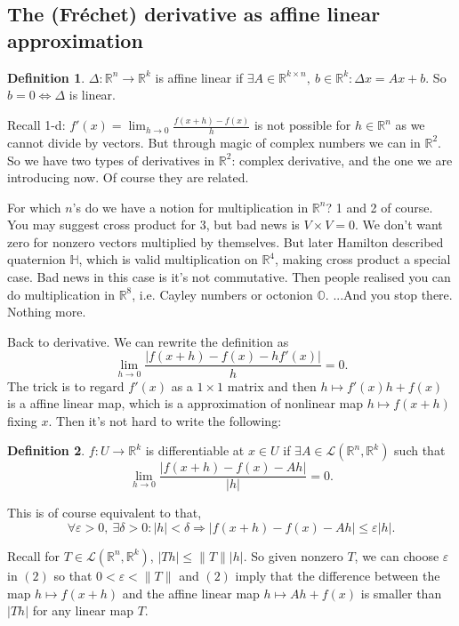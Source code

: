 \documentclass[a4paper]{article}
\theoremstyle{definition}
\newtheorem{defn}{Definition}[subsection]
\begin{document}
\subsection{The (Fréchet) derivative as affine linear approximation}
\begin{defn}
$\Delta :\mathbb R^n \rightarrow \mathbb R^k$ is affine linear if $\exists A\in \mathbb R^{k\times n},\ b\in \mathbb R^k : \Delta x = Ax+b$. So $b=0 \Leftrightarrow \Delta$ is linear.
\end{defn}
Recall 1-d: $f'(x) = \lim_{h\rightarrow 0} \frac{f(x+h)-f(x)}{h}$ is not possible for $h\in \mathbb R^n$ as we cannot divide by vectors. But through magic of complex numbers we can in $\mathbb R^2$. So we have two types of derivatives in $\mathbb R^2$: complex derivative, and the one we are introducing now. Of course they are related.

For which $n$'s do we have a notion for multiplication in $\mathbb R^n$? 1 and 2 of course. You may suggest cross product for 3, but bad news is $V\times V=0$. We don't want zero for nonzero vectors multiplied by themselves. But later Hamilton described quaternion $\mathbb H$, which is valid multiplication on $\mathbb R^4$, making cross product a special case. Bad news in this case is it's not commutative. Then people realised you can do multiplication in $\mathbb R^8$, i.e. Cayley numbers or octonion $\mathbb O$. ...And you stop there. Nothing more.

Back to derivative. We can rewrite the definition as
\[
\lim_{h\rightarrow 0} \frac{|f(x+h)-f(x)-hf'(x)|}{h}=0.
\]
The trick is to regard $f'(x)$ as a $1\times 1$ matrix and then $h\mapsto f'(x)h+f(x)$ is a affine linear map, which is a approximation of nonlinear map $h\mapsto f(x+h)$ fixing $x$. Then it's not hard to write the following:
\begin{defn}
$f:U\rightarrow \mathbb R^k$ is differentiable at $x\in U$ if $\exists A\in \mathcal L(\mathbb R^n,\mathbb R^k)$ such that \begin{equation}
    \lim_{h\rightarrow 0} \frac{|f(x+h)-f(x)-Ah|}{|h|}=0 .
\end{equation}
\end{defn}
This is of course equivalent to that, \begin{equation}\forall \varepsilon >0,\ \exists \delta>0 : |h|<\delta \Rightarrow |f(x+h)-f(x)-Ah| \leq \varepsilon |h|. \end{equation}

Recall for $T\in \mathcal L(\mathbb R^n,\mathbb R^k)$, $|Th| \leq \|T\| |h|$. So given nonzero $T$, we can choose $\varepsilon$ in $(2)$ so that $0<\varepsilon <\|T\|$ and $(2)$ imply that the difference between the map $h\mapsto f(x+h)$ and the affine linear map $h\mapsto Ah+f(x)$ is smaller than $|Th|$ for any linear map $T$.
\end{document}

